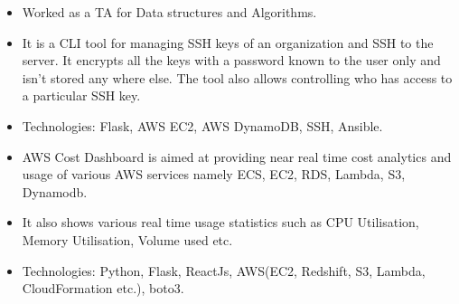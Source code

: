 \documentclass[10pt,a4paper]{altacv}
\begin{document}
\begin{itemize}
  \item Worked as a TA for Data structures and Algorithms.
\end{itemize}

\medskip





\begin{itemize}
    \item It is a CLI tool for managing SSH keys of an organization and SSH to the server. It encrypts all the keys with a password known to the user only and isn't stored any where else. The tool also allows controlling who has access to a particular SSH key.
    \item Technologies: Flask, AWS EC2, AWS DynamoDB, SSH, Ansible.
\end{itemize}

\divider

%



\begin{itemize}
    \item AWS Cost Dashboard is aimed at providing near real time cost analytics and usage of various AWS services namely ECS, EC2, RDS, Lambda, S3, Dynamodb.
    \item It also shows various real time usage statistics such as CPU Utilisation, Memory Utilisation, Volume used etc.
    \item Technologies: Python, Flask, ReactJs, AWS(EC2, Redshift, S3, Lambda, CloudFormation etc.), boto3.
\end{itemize}

%
\end{document}
